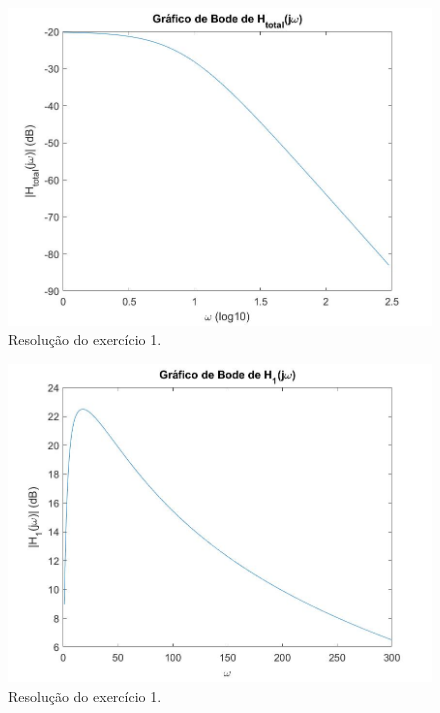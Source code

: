 \documentclass[a4paper,12pt,oneside,openany,table,xcdraw]{article}
\begin{document}
\begin{figure}[H]
\centering
\captionsetup{font=scriptsize}
\includegraphics[width=14.5cm]{Ex1_btot}
\caption{Resolução do exercício 1.}
\label{bode:htotal}
\end{figure}
\begin{figure}[H]
\centering
\captionsetup{font=scriptsize}
\includegraphics[width=14.5cm]{Ex1_c1}
\caption{Resolução do exercício 1.}
\label{bode:h1:linear}
\end{figure}
\end{document}
